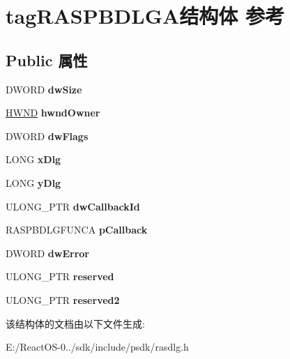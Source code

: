 \hypertarget{structtag_r_a_s_p_b_d_l_g_a}{}\section{tag\+R\+A\+S\+P\+B\+D\+L\+G\+A结构体 参考}
\label{structtag_r_a_s_p_b_d_l_g_a}
\subsection*{Public 属性}
\begin{DoxyCompactItemize}
\item 
\mbox{\label{structtag_r_a_s_p_b_d_l_g_a_afd7aeb361cf9eb8928d436c910ac1f79}} 
D\+W\+O\+RD {\bfseries dw\+Size}
\item 
\mbox{\label{structtag_r_a_s_p_b_d_l_g_a_aef42ccd61b5875990298dfc32815d785}} 
\hyperlink{interfacevoid}{H\+W\+ND} {\bfseries hwnd\+Owner}
\item 
\mbox{\label{structtag_r_a_s_p_b_d_l_g_a_a2d76490bf1ae5812ae9b9d80a12c821f}} 
D\+W\+O\+RD {\bfseries dw\+Flags}
\item 
\mbox{\label{structtag_r_a_s_p_b_d_l_g_a_ade6ec5a3e474939569599d4956bd711b}} 
L\+O\+NG {\bfseries x\+Dlg}
\item 
\mbox{\label{structtag_r_a_s_p_b_d_l_g_a_a43737aaa46b70edb14c1b56552485b7e}} 
L\+O\+NG {\bfseries y\+Dlg}
\item 
\mbox{\label{structtag_r_a_s_p_b_d_l_g_a_a6b217e821c2dcf3886db2ff9908ac919}} 
U\+L\+O\+N\+G\+\_\+\+P\+TR {\bfseries dw\+Callback\+Id}
\item 
\mbox{\label{structtag_r_a_s_p_b_d_l_g_a_a2a0db0849805cc16ac6706d86035c38b}} 
R\+A\+S\+P\+B\+D\+L\+G\+F\+U\+N\+CA {\bfseries p\+Callback}
\item 
\mbox{\label{structtag_r_a_s_p_b_d_l_g_a_a73de45fd8dd091c4335ae24c766216ae}} 
D\+W\+O\+RD {\bfseries dw\+Error}
\item 
\mbox{\label{structtag_r_a_s_p_b_d_l_g_a_a42c9ba8c29b176880fb23eb0396ab866}} 
U\+L\+O\+N\+G\+\_\+\+P\+TR {\bfseries reserved}
\item 
\mbox{\label{structtag_r_a_s_p_b_d_l_g_a_a20a591e5c226affb70828935de5cc422}} 
U\+L\+O\+N\+G\+\_\+\+P\+TR {\bfseries reserved2}
\end{DoxyCompactItemize}


该结构体的文档由以下文件生成\+:\begin{DoxyCompactItemize}
\item 
E\+:/\+React\+O\+S-\/0../sdk/include/psdk/rasdlg.\+h\end{DoxyCompactItemize}
